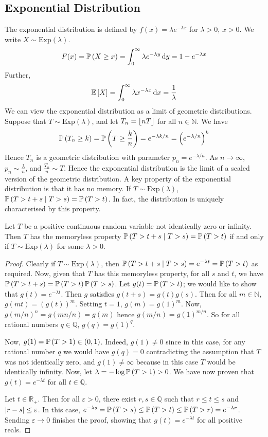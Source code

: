 \documentclass{article}
\begin{document}
\subsection{Exponential Distribution}
The exponential distribution is defined by $f(x) = \lambda e^{-\lambda x}$ for $\lambda > 0$, $x > 0$. We write $X \sim \mathrm{Exp}(\lambda)$.
\[ F(x) = \mathbb{P}\left({X \geq x}\right) = \int_0^\infty \lambda e^{-\lambda y} \dd{y} = 1 - e^{-\lambda x} \]
Further,
\[ \mathbb{E}\left[{X}\right] = \int_0^\infty \lambda x^{-\lambda x} \dd{x} = \frac{1}{\lambda} \]
We can view the exponential distribution as a limit of geometric distributions. Suppose that $T \sim \mathrm{Exp}(\lambda)$, and let $T_n = \lfloor nT\rfloor$ for all $n \in \mathbb N$. We have
\[ \mathbb{P}\left({T_n \geq k}\right) = \mathbb{P}\left({T \geq \frac{k}{n}}\right) = e^{-\lambda k / n} = \left( e^{-\lambda/n} \right)^k \]
Hence $T_n$ is a geometric distribution with parameter $p_n = e^{-\lambda/n}$. As $n \to \infty$, $p_n \sim \frac{\lambda}{n}$, and $\frac{T_n}{n} \sim T$. Hence the exponential distribution is the limit of a scaled version of the geometric distribution. A key property of the exponential distribution is that it has no memory. If $T \sim \mathrm{Exp}(\lambda)$, $\mathbb{P}\left({T > t + s \mid T > s}\right) = \mathbb{P}\left({T > t}\right)$. In fact, the distribution is uniquely characterised by this property.
\begin{proposition}
    Let $T$ be a positive continuous random variable not identically zero or infinity. Then $T$ has the memoryless property $\mathbb{P}\left({T > t + s \mid T > s}\right) = \mathbb{P}\left({T > t}\right)$ if and only if $T \sim \mathrm{Exp}(\lambda)$ for some $\lambda > 0$.
\end{proposition}
\begin{proof}
    Clearly if $T \sim \mathrm{Exp}(\lambda)$, then $\mathbb{P}\left({T > t + s \mid T > s}\right) = e^{-\lambda t} = \mathbb{P}\left({T > t}\right)$ as required. Now, given that $T$ has this memoryless property, for all $s$ and $t$, we have $\mathbb{P}\left({T > t + s}\right) = \mathbb{P}\left({T > t}\right) \mathbb{P}\left({T > s}\right)$. Let $g(t) = \mathbb{P}\left({T > t}\right)$; we would like to show that $g(t) = e^{-\lambda t}$. Then $g$ satisfies $g(t+s) = g(t)g(s)$. Then for all $m \in \mathbb N$, $g(mt) = (g(t))^m$. Setting $t=1$, $g(m) = g(1)^m$. Now, $g(m/n)^n = g(mn/n) = g(m)$ hence $g(m/n) = g(1)^{m/n}$. So for all rational numbers $q \in \mathbb Q$, $g(q) = g(1)^q$.

    Now, $g(1) = \mathbb{P}\left({T > 1}\right) \in (0, 1)$. Indeed, $g(1) \neq 0$ since in this case, for any rational number $q$ we would have $g(q) = 0$ contradicting the assumption that $T$ was not identically zero, and $g(1) \neq \infty$ because in this case $T$ would be identically infinity. Now, let $\lambda = -\log\mathbb{P}\left({T > 1}\right) > 0$. We have now proven that $g(t) = e^{-\lambda t}$ for all $t\in\mathbb Q$.

    Let $t \in \mathbb R_+$. Then for all $\varepsilon > 0$, there exist $r, s \in \mathbb Q$ such that $r \leq t \leq s$ and $\abs{r - s} \leq \varepsilon$. In this case, $e^{-\lambda s} = \mathbb{P}\left({T > s}\right) \leq \mathbb{P}\left({T > t}\right) \leq \mathbb{P}\left({T > r}\right) = e^{-\lambda r}$. Sending $\varepsilon \to 0$ finishes the proof, showing that $g(t) = e^{-\lambda t}$ for all positive reals.
\end{proof}
\end{document}
